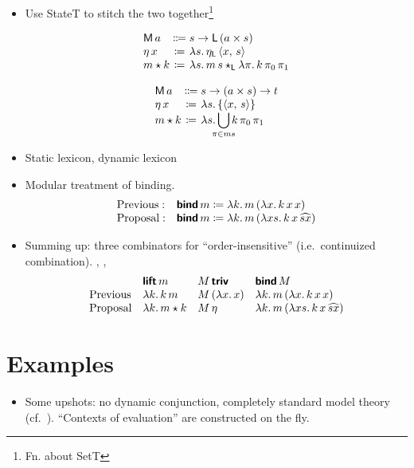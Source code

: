 \begin{itemize}
	\item Use StateT to stitch the two together\footnote{Fn. about SetT}
	\begin{defi}\label{statet}
		\[\begin{array}[t]
			{@{}l@{}c@{}l@{}}
			\textsf{M}\,a &{}\Coloneqq{} &s \ra \textsf{L}\,(a \times s)%
			\\
			\eta\,x &{}\ceq{} &\lambda s .\,\eta_\textsf{L}\,\ab{x,\,s}
			\\
			m \star k &{}\ceq{} &\lambda s.\, m\,s\star_\textsf{L} \lambda \pi.\,k\,\pi_0\,\pi_1%
		\end{array}\]
	\end{defi}
	\begin{defi}\label{stateset}
		\[\begin{array}[t]
			{@{}l@{}c@{}l@{}}
			\textsf{M}\,a &{}\Coloneqq{} &s \ra (a \times s) \ra t%
			\\
			\eta\,x &{}\ceq{} &\lambda s.\left\{\ab{x,\,s}\right\}
			\\
			m \star k &{}\ceq{} &\lambda s.\displaystyle\bigcup_{\mathclap{\pi\in ms}}k\,\pi_0\,\pi_1%
		\end{array}\]
	\end{defi}
	

	\item Static lexicon, dynamic lexicon
	
	\item Modular treatment of binding.%
	\[\begin{array}{ll}
		\text{Previous}:& \bsf{bind}\,m \ceq \lambda k.\,m\,(\lambda x.\,k\,x\,x)%
		\\
		\text{Proposal}:& \bsf{bind}\,m \ceq \lambda k.\,m\,(\lambda xs.\,k\,x\,\widehat{sx})%
	\end{array}\]
	
	\item Summing up: three combinators for ``order-insensitive'' (i.e.~continuized combination). , , %
	\[\begin{array}{lllll}
		& \bsf{lift}\,m & M\,\bsf{triv} & \bsf{bind}\,M %
		\\
		\text{Previous} & \lambda k.\,k\,m & M\,(\lambda x.\,x) & \lambda k.\,m\,(\lambda x.\,k\,x\,x)%
		\\
		\text{Proposal} & \lambda k.\,m \star k & M\,\eta & \lambda k.\,m\,(\lambda xs.\,k\,x\,\widehat{sx})%
	\end{array}\]
\end{itemize}

\section{Examples}
\begin{itemize}
	\item Some upshots: no dynamic conjunction, completely standard model theory (cf.~\citealt{Groote:2006}). ``Contexts of evaluation'' are constructed on the fly. %
	\end{itemize}

\citealt{Groote:2001}
\citealt{Charlow:diss}
\citealt{Bumford:inc}

{\small}
